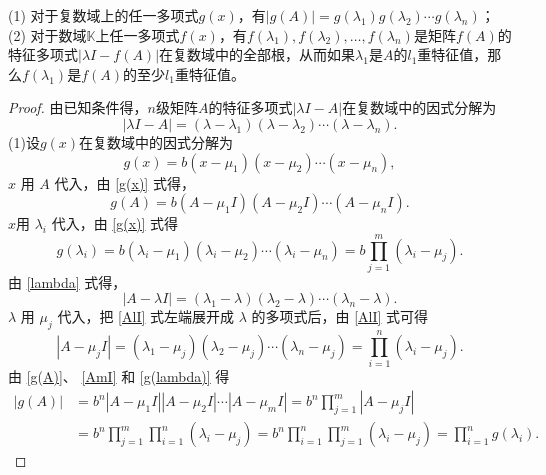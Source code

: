 \begin{enumerate}[1~]
\begin{enumerate}[1.~]
\begin{remark}
(1) 对于复数域上的任一多项式$g(x)$，有$|g(A)| = g(\lambda_1) g(\lambda_2) \cdots g(\lambda_n)$；\\
(2) 对于数域$\mathbb{K}$上任一多项式$f(x)$，有$f(\lambda_1), f(\lambda_2), \dots, f(\lambda_n)$是矩阵$f(A)$的特征多项式$|\lambda I -f(A)|$在复数域中的全部根，从而如果$\lambda_1$是$A$的$l_1$重特征值，那么$f(\lambda_1)$是$f(A)$的至少$l_1$重特征值。
\begin{proof}
由已知条件得，$n$级矩阵$A$的特征多项式$|\lambda I-A|$在复数域中的因式分解为\begin{equation}\label{lambda}
| \lambda I -A | = (\lambda - \lambda_1)(\lambda - \lambda_2) \cdots (\lambda - \lambda_n).
\end{equation}
(1)设$g(x)$在复数域中的因式分解为\begin{equation}\label{g(x)}
g(x) = b(x-\mu_1)(x-\mu_2) \cdots (x-\mu_n),
\end{equation}
$x$ 用 $A$ 代入，由 \eqref{g(x)} 式得，\begin{equation} \label{g(A)}
g(A) = b(A-\mu_1 I)(A-\mu_2 I) \cdots (A-\mu_n I).
\end{equation}
$x$用 $\lambda_i$ 代入，由 \eqref{g(x)} 式得 \begin{equation}\label{g(lambda)}
g(\lambda_i) = b(\lambda_i - \mu_1)(\lambda_i - \mu_2) \cdots (\lambda_i - \mu_n) = b \prod_{j=1}^m (\lambda_i - \mu_j).
\end{equation}
由 \eqref{lambda} 式得，\begin{equation} \label{AlI}
|A-\lambda I| = (\lambda_1 - \lambda) (\lambda_2 - \lambda) \cdots  (\lambda_n - \lambda).
\end{equation}
$\lambda$ 用 $\mu_j$ 代入，把 \eqref{AlI} 式左端展开成 $\lambda$ 的多项式后，由 \eqref{AlI} 式可得 \begin{equation} \label{AmI}
| A-\mu_j I| = (\lambda_1 - \mu_j)(\lambda_2 - \mu_j) \cdots (\lambda_n - \mu_j) = \prod_{i=1}^n (\lambda_i - \mu_j).
\end{equation}
由 \eqref{g(A)}、 \eqref{AmI} 和 \eqref{g(lambda)} 得
\begin{align}\label{|g(A)|}
|g(A)| &= b^n |A -\mu_1 I||A -\mu_2 I| \cdots |A -\mu_m I| = b ^ { n } \prod _ { j = 1 } ^ { m } \left| A - \mu _ { j } I\right|\\
&= b ^ { n } \prod _ { j = 1 } ^ { m } \prod _ { i = 1 } ^ { n } \left( \lambda _ { i } - \mu _ { j } \right) = b ^ { n } \prod _ { i = 1 } ^ { n } \prod _ { j = 1 } ^ { m } \left( \lambda _ { i } - \mu _ { j } \right) = \prod _ { i = 1 } ^ { n } g \left( \lambda _ { i } \right).
\end{align}


\end{proof}
\end{remark}
\end{enumerate}
\end{enumerate}
